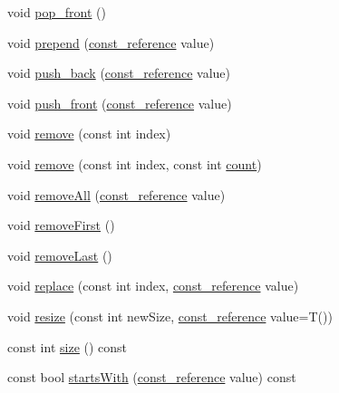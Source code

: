 \begin{DoxyCompactItemize}
\item 
void \hyperlink{classprism_1_1_deque_ae5cf88ede4df7c69eae99be9a68696f8}{pop\+\_\+front} ()
\item 
void \hyperlink{classprism_1_1_deque_a041ad68dab4d12f1865def610bee8afd}{prepend} (\hyperlink{classprism_1_1_deque_affa26df70d5123f79a59386056e920c3}{const\+\_\+reference} value)
\item 
void \hyperlink{classprism_1_1_deque_a58f4d73989d4c20334c9b08f1b2102a5}{push\+\_\+back} (\hyperlink{classprism_1_1_deque_affa26df70d5123f79a59386056e920c3}{const\+\_\+reference} value)
\item 
void \hyperlink{classprism_1_1_deque_a6022cf0af9cccf6bee0b7354abaa095e}{push\+\_\+front} (\hyperlink{classprism_1_1_deque_affa26df70d5123f79a59386056e920c3}{const\+\_\+reference} value)
\item 
void \hyperlink{classprism_1_1_deque_a0ca9d240f53aec7b80ecaa66b1e91556}{remove} (const int index)
\item 
void \hyperlink{classprism_1_1_deque_aed7d989e9381b64255cd6ce7b1ae4c45}{remove} (const int index, const int \hyperlink{classprism_1_1_deque_afbd3bd892ee68247cb75a7bfb8b168e2}{count})
\item 
void \hyperlink{classprism_1_1_deque_ad50a492081c41da88978315e4be3e228}{remove\+All} (\hyperlink{classprism_1_1_deque_affa26df70d5123f79a59386056e920c3}{const\+\_\+reference} value)
\item 
void \hyperlink{classprism_1_1_deque_acaedd5fa8d2d99a31dff5c114317313c}{remove\+First} ()
\item 
void \hyperlink{classprism_1_1_deque_a34ea6bcbec4ef0f754c4ff66c70a81af}{remove\+Last} ()
\item 
void \hyperlink{classprism_1_1_deque_ac285d3f092073cfecd8a6664c2b2068c}{replace} (const int index, \hyperlink{classprism_1_1_deque_affa26df70d5123f79a59386056e920c3}{const\+\_\+reference} value)
\item 
void \hyperlink{classprism_1_1_deque_a156f37e7e13442dd57365ede5d9fa959}{resize} (const int new\+Size, \hyperlink{classprism_1_1_deque_affa26df70d5123f79a59386056e920c3}{const\+\_\+reference} value=T())
\item 
const int \hyperlink{classprism_1_1_deque_a16c6d7b9640486229fd379e60e026098}{size} () const 
\item 
const bool \hyperlink{classprism_1_1_deque_ac2d509b6377cbbe0064d9996c9f75a04}{starts\+With} (\hyperlink{classprism_1_1_deque_affa26df70d5123f79a59386056e920c3}{const\+\_\+reference} value) const 
\item 

\end{DoxyCompactItemize}
